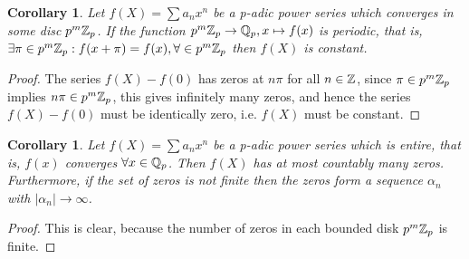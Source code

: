 \documentclass[a4paper]{article}
\theoremstyle{plain}
\newtheorem{Cor}[thm]{Corollary}
\theoremstyle{definition}
\begin{document}
\begin{Cor}
  Let $f(X) = \sum a_{n}x^{n}$ be a p-adic power series which converges in some disc $p^{m}\Bbb Z_{p}$. If the function $p^{m}\Bbb Z_{p} \to \Bbb Q_{p}, x \mapsto f(x)$ is periodic, that is, $\exists \pi \in p^{m}\Bbb Z_{p} : f(x + \pi) = f(x), \forall \in p^{m}\Bbb Z_{p}$ then $f(X)$ is constant.
\end{Cor}
\begin{proof}
The series $f(X) - f(0)$ has zeros at $n\pi$ for all $n \in \Bbb Z$, since $\pi \in p^{m}\Bbb Z_{p}$ implies $n\pi \in p^{m}\Bbb Z_{p}$, this gives infinitely many zeros, and hence the series $f(X) - f(0)$ must be identically zero, i.e. $f(X)$ must be constant.
\end{proof}
\begin{Cor}
  Let $f(X) = \sum a_{n}x^{n}$ be a p-adic power series which is entire, that is, $f(x)$ converges $\forall x \in \Bbb Q_{p}$. Then $f(X)$ has at most countably many zeros. Furthermore, if the set of zeros is not finite then the zeros form a sequence $\alpha_{n}$ with $|\alpha_{n}| \to \infty$.
\end{Cor}
\begin{proof}
  This is clear, because the number of zeros in each bounded disk $p^{m}\Bbb Z_{p}$ is finite.
\end{proof}
\end{document}
